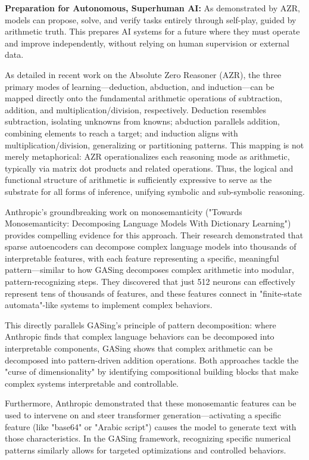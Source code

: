 \noindent\textbf{\textbf{Preparation for Autonomous, Superhuman AI}:} As demonstrated by AZR, models can propose, solve, and verify tasks entirely through self-play, guided by arithmetic truth. This prepares AI systems for a future where they must operate and improve independently, without relying on human supervision or external data.


As detailed in recent work on the Absolute Zero Reasoner (AZR), the three primary modes of learning—deduction, abduction, and induction—can be mapped directly onto the fundamental arithmetic operations of subtraction, addition, and multiplication/division, respectively. Deduction resembles subtraction, isolating unknowns from knowns; abduction parallels addition, combining elements to reach a target; and induction aligns with multiplication/division, generalizing or partitioning patterns. This mapping is not merely metaphorical: AZR operationalizes each reasoning mode as arithmetic, typically via matrix dot products and related operations. Thus, the logical and functional structure of arithmetic is sufficiently expressive to serve as the substrate for all forms of inference, unifying symbolic and sub-symbolic reasoning.

Anthropic's groundbreaking work on monosemanticity ("Towards Monosemanticity: Decomposing Language Models With Dictionary Learning") provides compelling evidence for this approach. Their research demonstrated that sparse autoencoders can decompose complex language models into thousands of interpretable features, with each feature representing a specific, meaningful pattern—similar to how GASing decomposes complex arithmetic into modular, pattern-recognizing steps. They discovered that just 512 neurons can effectively represent tens of thousands of features, and these features connect in "finite-state automata"-like systems to implement complex behaviors.

This directly parallels GASing's principle of pattern decomposition: where Anthropic finds that complex language behaviors can be decomposed into interpretable components, GASing shows that complex arithmetic can be decomposed into pattern-driven addition operations. Both approaches tackle the "curse of dimensionality" by identifying compositional building blocks that make complex systems interpretable and controllable.

Furthermore, Anthropic demonstrated that these monosemantic features can be used to intervene on and steer transformer generation—activating a specific feature (like "base64" or "Arabic script") causes the model to generate text with those characteristics. In the GASing framework, recognizing specific numerical patterns similarly allows for targeted optimizations and controlled behaviors.


